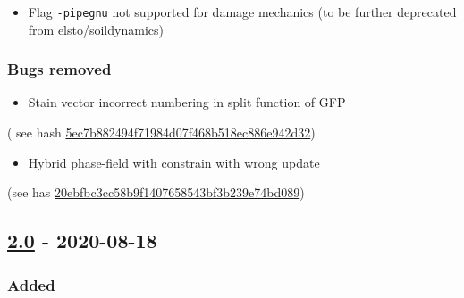 \begin{itemize}
\tightlist
\item
  Flag \lstinline!-pipegnu! not supported for damage mechanics (to be
  further deprecated from elsto/soildynamics)
\end{itemize}

\subsubsection{Bugs removed}

\begin{itemize}
\tightlist
\item
  Stain vector incorrect numbering in split function of GFP
\end{itemize}

( see hash
\href{https://codev-tuleap.intra.cea.fr/plugins/git/hpcseism/freefem?a=commit\&h=5ec7b882494f71984d07f468b518ec886e942d32}{5ec7b882494f71984d07f468b518ec886e942d32})

\begin{itemize}
\tightlist
\item
  Hybrid phase-field with constrain with wrong update
\end{itemize}

(see has
\href{https://codev-tuleap.intra.cea.fr/plugins/git/hpcseism/freefem?a=commit\&h=20ebfbc3cc58b9f1407658543bf3b239e74bd089}{20ebfbc3cc58b9f1407658543bf3b239e74bd089})

\subsection{\texorpdfstring{\href{https://gitlab.com/PsdSolver/psd_sources/-/tree/v2.0}{2.0}
- 2020-08-18}{2.0 - 2020-08-18}}

\subsubsection{Added}


